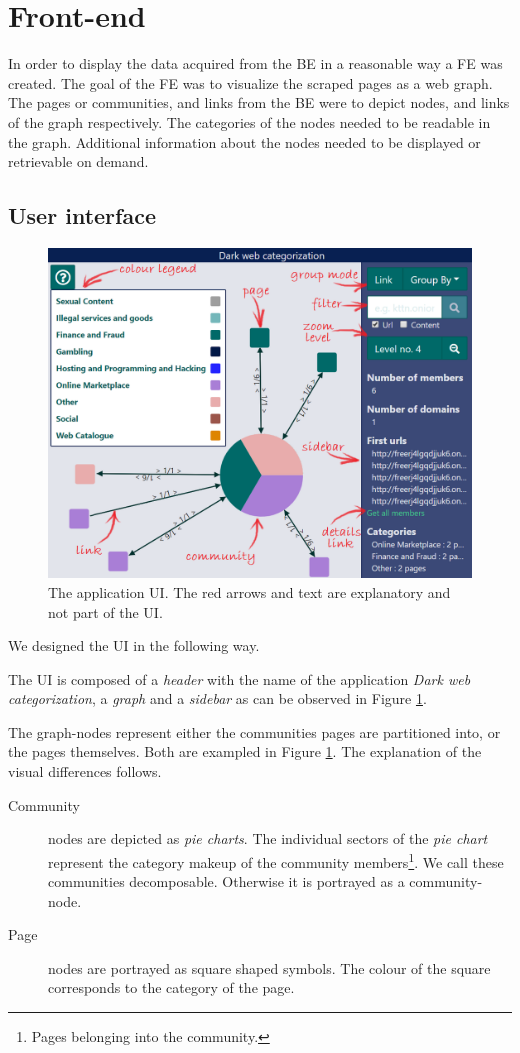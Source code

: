 \section{Front-end}
In order to display the data acquired from the BE in a reasonable way a FE was created. The goal of the FE was to visualize the scraped pages as a web graph. The pages or communities, and links from the BE were to depict nodes, and links of the graph respectively. The categories of the nodes needed to be readable in the graph. Additional information about the nodes needed to be displayed or retrievable on demand.

\subsection{User interface} \label{FEUI}
\begin{figure}[ht]
  \centering
  \includegraphics[width=\textwidth]{Images/basic_view.png}
  \caption{The application UI. The red arrows and text are explanatory and not part of the UI.}
  \label{MixedGraphBasic}
\end{figure}  
We designed the UI in the following way.

The UI is composed of a \textit{header} with the name of the application \textit{Dark web categorization}, a \textit{graph} and a \textit{sidebar} as can be observed in Figure \ref{MixedGraphBasic}. 

The graph-nodes represent either the communities pages are partitioned into, or the pages themselves. Both are exampled in Figure \ref{MixedGraphBasic}. The explanation of the visual differences follows.
\begin{description}
    \item[Community]  nodes are depicted as \textit{pie charts}. The individual sectors of the \textit{pie chart} represent the category makeup of the community members\footnote{Pages belonging into the community.}. We call these communities decomposable. Otherwise it is portrayed as a community-node. 
    \item[Page] nodes are portrayed as square shaped symbols. The colour of the square corresponds to the category of the page.
\end{description}  

